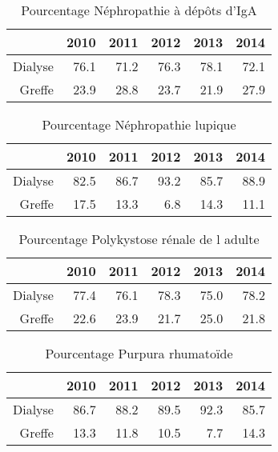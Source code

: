\documentclass[11pt,a4paper]{article}\usepackage[]{graphicx}\usepackage[]{color}
\begin{document}
\begin{multicols}{2}
\begin{table}[H]
\end{table}
\begin{table}[H]
\centering
\begin{tabular}{rrrrrr}
  \hline
 & 2010 & 2011 & 2012 & 2013 & 2014 \\ 
  \hline
Dialyse & 76.1 & 71.2 & 76.3 & 78.1 & 72.1 \\ 
  Greffe & 23.9 & 28.8 & 23.7 & 21.9 & 27.9 \\ 
   \hline
\end{tabular}
\caption{Pourcentage Néphropathie à dépôts d'IgA} 
\end{table}
\begin{table}[H]
\centering
\begin{tabular}{rrrrrr}
  \hline
 & 2010 & 2011 & 2012 & 2013 & 2014 \\ 
  \hline
Dialyse & 82.5 & 86.7 & 93.2 & 85.7 & 88.9 \\ 
  Greffe & 17.5 & 13.3 & 6.8 & 14.3 & 11.1 \\ 
   \hline
\end{tabular}
\caption{Pourcentage Néphropathie lupique} 
\end{table}
\begin{table}[H]
\centering
\begin{tabular}{rrrrrr}
  \hline
 & 2010 & 2011 & 2012 & 2013 & 2014 \\ 
  \hline
Dialyse & 77.4 & 76.1 & 78.3 & 75.0 & 78.2 \\ 
  Greffe & 22.6 & 23.9 & 21.7 & 25.0 & 21.8 \\ 
   \hline
\end{tabular}
\caption{Pourcentage Polykystose rénale de l adulte} 
\end{table}
\begin{table}[H]
\centering
\begin{tabular}{rrrrrr}
  \hline
 & 2010 & 2011 & 2012 & 2013 & 2014 \\ 
  \hline
Dialyse & 86.7 & 88.2 & 89.5 & 92.3 & 85.7 \\ 
  Greffe & 13.3 & 11.8 & 10.5 & 7.7 & 14.3 \\ 
   \hline
\end{tabular}
\caption{Pourcentage Purpura rhumatoïde} 
\end{table}

\end{multicols}
\end{document}
